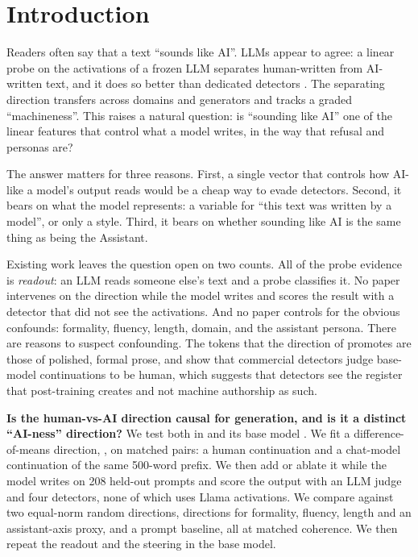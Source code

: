 \section{Introduction}
\label{sec:intro}

Readers often say that a text ``sounds like AI''. LLMs appear to agree: a linear probe on the activations of a frozen LLM separates human-written from AI-written text, and it does so better than dedicated detectors \citep{quaremba2026linear,vishnyakov2026svdetect,kuznetsov2025sae}.
The separating direction transfers across domains and generators and tracks a graded ``machineness''.
This raises a natural question: is ``sounding like AI'' one of the linear features that control what a model writes, in the way that refusal \citep{arditi2024refusal} and personas \citep{chen2025persona,lu2026assistant} are?

The answer matters for three reasons.
First, a single vector that controls how AI-like a model's output reads would be a cheap way to evade detectors.
Second, it bears on what the model represents: a variable for ``this text was written by a model'', or only a style.
Third, it bears on whether sounding like AI is the same thing as being the Assistant.

Existing work leaves the question open on two counts.
All of the probe evidence is {\em readout}: an LLM reads someone else's text and a probe classifies it.
No paper intervenes on the direction while the model writes and scores the result with a detector that did not see the activations.
And no paper controls for the obvious confounds: formality, fluency, length, domain, and the assistant persona.
There are reasons to suspect confounding.
The tokens that the direction of \citet{vishnyakov2026svdetect} promotes are those of polished, formal prose, and \citet{xu2026base} show that commercial detectors judge base-model continuations to be human, which suggests that detectors see the register that post-training creates and not machine authorship as such.

{\bf Is the human-vs-AI direction causal for generation, and is it a distinct ``AI-ness'' direction?}
We test both in \llamai and its base model \llamab.
We fit a difference-of-means direction, \airead, on matched pairs: a human continuation and a chat-model continuation of the same 500-word prefix.
We then add or ablate it while the model writes on 208 held-out prompts and score the output with an LLM judge and four detectors, none of which uses Llama activations.
We compare against two equal-norm random directions, directions for formality, fluency, length and an assistant-axis proxy, and a prompt baseline, all at matched coherence.
We then repeat the readout and the steering in the base model.

